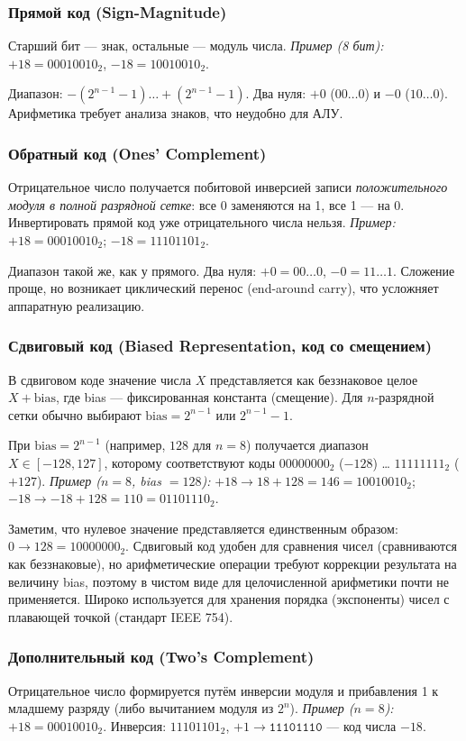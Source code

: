 \subsubsection{Прямой код (Sign-Magnitude)}
Старший бит — знак, остальные — модуль числа.
\textit{Пример (8 бит):} $+18 = 00010010_2$, $-18 = 10010010_2$.

Диапазон: $-(2^{n-1}-1) \dots +(2^{n-1}-1)$. Два нуля: $+0$ ($00\dots0$) и $-0$ ($10\dots0$).
Арифметика требует анализа знаков, что неудобно для АЛУ.

\subsubsection{Обратный код (Ones' Complement)}
Отрицательное число получается побитовой инверсией записи
\emph{положительного модуля в полной разрядной сетке}: все 0 заменяются
на 1, все 1 --- на 0. Инвертировать прямой код уже отрицательного числа нельзя.
\textit{Пример:} $+18 = 00010010_2$; $-18 = 11101101_2$.

Диапазон такой же, как у прямого. Два нуля: $+0 = 00\dots0$, $-0 = 11\dots1$.
Сложение проще, но возникает циклический перенос (end-around carry), что усложняет аппаратную реализацию.

\subsubsection{Сдвиговый код (Biased Representation, код со смещением)}
В сдвиговом коде значение числа $X$ представляется как беззнаковое целое $X + \text{bias}$, где bias — фиксированная константа (смещение). Для $n$-разрядной сетки обычно выбирают $\text{bias} = 2^{n-1}$ или $2^{n-1}-1$.

При $\text{bias}=2^{n-1}$ (например, $128$ для $n=8$) получается диапазон $X \in [-128, 127]$, которому соответствуют коды $00000000_2$ ($-128$) … $11111111_2$ ($+127$).
\textit{Пример ($n=8$, bias $=128$):} $+18 \to 18+128=146 = 10010010_2$; $-18 \to -18+128=110 = 01101110_2$.

Заметим, что нулевое значение представляется единственным образом: $0 \to 128 = 10000000_2$.
Сдвиговый код удобен для сравнения чисел (сравниваются как беззнаковые), но арифметические операции требуют коррекции результата на величину bias, поэтому в чистом виде для целочисленной арифметики почти не применяется. Широко используется для хранения порядка (экспоненты) чисел с плавающей точкой (стандарт IEEE 754).

\subsubsection{Дополнительный код (Two's Complement)}
Отрицательное число формируется путём инверсии модуля и прибавления 1 к младшему разряду (либо вычитанием модуля из $2^n$).
\textit{Пример ($n=8$):} $+18 = 00010010_2$. Инверсия: $11101101_2$,
$+1 \to \texttt{11101110}$ --- код числа $-18$.


